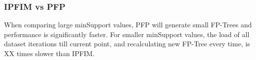 \documentclass[sigconf, nonacm]{acmart}
\begin{document}
\subsubsection{IPFIM vs PFP}
When comparing large minSupport values, PFP will generate small FP-Trees and performance is significantly faster. For smaller minSupport values, the load of all dataset iterations till current point, and recalculating new FP-Tree every time, is XX times slower than IPFIM.

%
%
%
%
%
%
\end{document}
